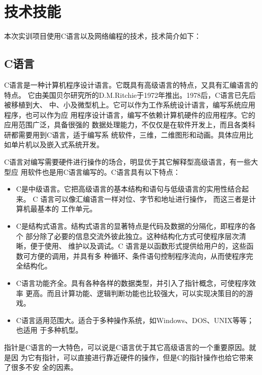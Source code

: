 \documentclass[12pt, a4paper, titlepage]{article}
\begin{document}
\section{技术技能}
本次实训项目使用C语言以及网络编程的技术，技术简介如下：
\subsection{C语言}
\par{
	C语言是一种计算机程序设计语言。它既具有高级语言的特点，又具有汇编语言的特点。
	它由美国贝尔研究所的D.M.Ritchie于1972年推出。1978后，C语言已先后被移植到大、
	中、小及微型机上。它可以作为工作系统设计语言，编写系统应用程序，也可以作为应
	用程序设计语言，编写不依赖计算机硬件的应用程序。它的应用范围广泛，具备很强的
	数据处理能力，不仅仅是在软件开发上，而且各类科研都需要用到C语言，适于编写系
	统软件，三维，二维图形和动画。具体应用比如单片机以及嵌入式系统开发。
}
\par{
	C语言对编写需要硬件进行操作的场合，明显优于其它解释型高级语言，有一些大型应
	用软件也是用C语言编写的。C语言具有以下特点：	
}

\begin{itemize}
	\item C是中级语言。它把高级语言的基本结构和语句与低级语言的实用性结合起来。
	C 语言可以像汇编语言一样对位、字节和地址进行操作， 而这三者是计算机最基本的
	工作单元。
	\item C是结构式语言。结构式语言的显著特点是代码及数据的分隔化，即程序的各个
	部分除了必要的信息交流外彼此独立。这种结构化方式可使程序层次清晰，便于使用、
	维护以及调试。C 语言是以函数形式提供给用户的，这些函数可方便的调用，并具有多
	种循环、条件语句控制程序流向，从而使程序完全结构化。
	\item C语言功能齐全。具有各种各样的数据类型，并引入了指针概念，可使程序效率
	更高。而且计算功能、逻辑判断功能也比较强大，可以实现决策目的的游戏。
	\item  C语言适用范围大。适合于多种操作系统，如Windows、DOS、UNIX等等；也适用
	于多种机型。
\end{itemize}

\par{ 指针是C语言的一大特色，可以说是C语言优于其它高级语言的一个重要原因。就是因
	为它有指针，可以直接进行靠近硬件的操作，但是C的指针操作也给它带来了很多不安
	全的因素。
	}
\end{document}

